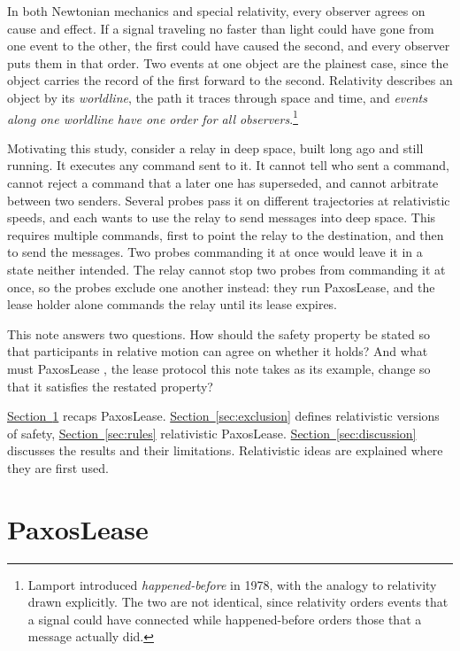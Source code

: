 \documentclass[final,5p,times,twocolumn,number]{elsarticle}
\newcommand{\secref}[1]{\hyperref[#1]{Section~\ref*{#1}}}
\begin{document}
In both Newtonian mechanics and special relativity, every observer agrees on cause and effect.  If a signal traveling no faster than light could have gone from one event to the other, the first could have caused the second, and every observer puts them in that order.  Two events at one object are the plainest case, since the object carries the record of the first forward to the second.  Relativity describes an object by its \emph{worldline}, the path it traces through space and time, and \emph{events along one worldline have one order for all observers}.\footnote{Lamport introduced \emph{happened-before} \cite{ref3} in 1978, with the analogy to relativity drawn explicitly.  The two are not identical, since relativity orders events that a signal could have connected while happened-before orders those that a message actually did.}

Motivating this study, consider a relay in deep space, built long ago and still running.  It executes any command sent to it.  It cannot tell who sent a command, cannot reject a command that a later one has superseded, and cannot arbitrate between two senders.  Several probes pass it on different trajectories at relativistic speeds, and each wants to use the relay to send messages into deep space.  This requires multiple commands, first to point the relay to the destination, and then to send the messages.  Two probes commanding it at once would leave it in a state neither intended.  The relay cannot stop two probes from commanding it at once, so the probes exclude one another instead: they run PaxosLease, and the lease holder alone commands the relay until its lease expires.

This note answers two questions.  How should the safety property be stated so that participants in relative motion can agree on whether it holds?  And what must PaxosLease \cite{ref1,ref2}, the lease protocol this note takes as its example, change so that it satisfies the restated property?

\secref{sec:paxoslease} recaps PaxosLease.  \secref{sec:exclusion} defines relativistic versions of safety, \secref{sec:rules} relativistic PaxosLease.  \secref{sec:discussion} discusses the results and their limitations.  Relativistic ideas are explained where they are first used.

\section{PaxosLease}\label{sec:paxoslease}
\end{document}
